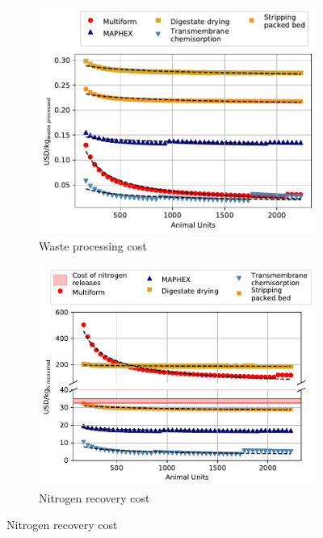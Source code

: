 \begin{refsection}[referencesCh6]

\begin{figure}[h!]
	\centering 
	\begin{subfigure}[t]{0.7\textwidth}
		\centering
		\includegraphics[width=1\linewidth, trim={0cm 0cm 0cm 0cm},clip]{gfx/Chapter6/ScaleUp2WasteProcCost.pdf} 
		\caption{Waste processing cost}
		\label{fig:ScaleUp2WasteProcCost}
	\end{subfigure}
	\bigskip
	\begin{subfigure}[t]{0.72\textwidth}
		\centering
		\includegraphics[width=1\linewidth, trim={0cm 0cm 0cm 0cm},clip]{gfx/Chapter6/ScaleUp2.pdf} 
		\caption{Nitrogen recovery cost}
		\label{fig:ScaleUp2}
	\end{subfigure}
	

\end{figure}
\end{refsection}
